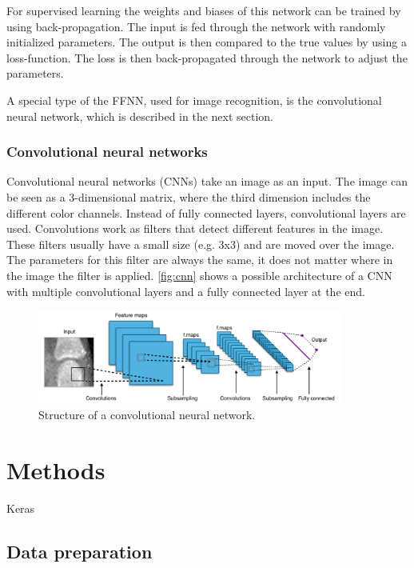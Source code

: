\documentclass[12pt]{article}
\begin{document}
For supervised learning the weights and biases of this network can be trained by using back-propagation. The input is fed through the network with randomly initialized parameters. The output is then compared to the true values by using a loss-function. The loss is then back-propagated through the network to adjust the parameters.

A special type of the FFNN, used for image recognition, is the convolutional neural network, which is described in the next section.

\subsubsection{Convolutional neural networks}
\label{subsubsec:cnn}
Convolutional neural networks (CNNs) take an image as an input. The image can be seen as a 3-dimensional matrix, where the third dimension includes the different color channels. Instead of fully connected layers, convolutional layers are used. Convolutions work as filters that detect different features in the image. These filters usually have a small size (e.g. 3x3) and are moved over the image. The parameters for this filter are always the same, it does not matter where in the image the filter is applied. \autoref{fig:cnn} shows a possible architecture of a CNN with multiple convolutional layers and a fully connected layer at the end.

\begin{figure}[ht]
\includegraphics[width=10cm]{cnn}	
\caption{Structure of a convolutional neural network.}
\label{fig:cnn}
\end{figure}


\newpage
\section{Methods}
\label{sec:methods}

Keras %

\subsection{Data preparation}
\end{document}
